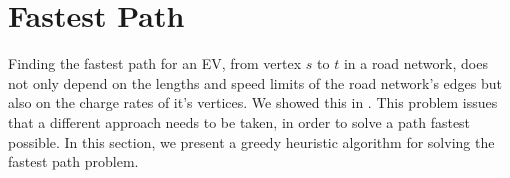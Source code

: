 \section{Fastest Path}

Finding the fastest path for an EV, from vertex $s$ to $t$ in a road network, does not only depend on the lengths and speed limits of the road network's edges but also on the charge rates of it's vertices. We showed this in . This problem issues that a different approach needs to be taken, in order to solve a path fastest possible. In this section, we present a greedy heuristic algorithm for solving the fastest path problem.  